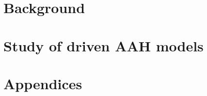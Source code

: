 \documentclass[12pt,a4paper,twoside,openany]{report}
\theoremstyle{definition}	\newtheorem{theorem}{Theorem}[section]
\begin{document}
  
  
  \part{Background}
  	
  
  
  
  
  \part{Study of driven AAH models}
  
  
  
%   
    
  \renewcommand{\thechapter}{\Alph{chapter}}
  \part{Appendices}
    
    
  \printbibliography
\end{document}
